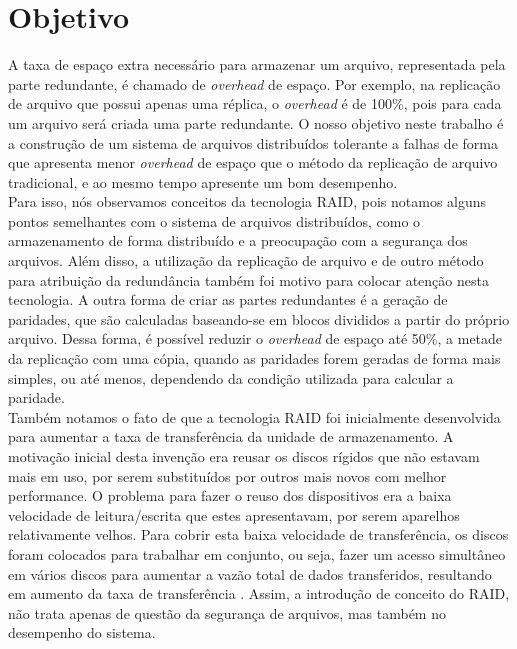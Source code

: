 
\section{Objetivo}

A taxa de espaço extra necessário para armazenar um arquivo, representada pela parte redundante, é chamado de \textit{overhead} de espaço.
Por exemplo, na replicação de arquivo que possui apenas uma réplica, o \textit{overhead} é de 100\%, pois para cada um arquivo será criada uma parte redundante.
O nosso objetivo neste trabalho é a construção de um sistema de arquivos distribuídos tolerante a falhas de forma que apresenta menor \textit{overhead} de espaço que o método da replicação de arquivo tradicional, e ao mesmo tempo apresente um bom desempenho.
\\

Para isso, nós observamos conceitos da tecnologia RAID, pois notamos alguns pontos semelhantes com o sistema de arquivos distribuídos, como o armazenamento de forma distribuído e a preocupação com a segurança dos arquivos.
Além disso, a utilização da replicação de arquivo e de outro método para atribuição da redundância também foi motivo para colocar atenção nesta tecnologia.
A outra forma de criar as partes redundantes é a geração de paridades, que são calculadas baseando-se em blocos divididos a partir do próprio arquivo.
Dessa forma, é possível reduzir o \textit{overhead} de espaço até 50\%, a metade da replicação com uma cópia, quando as paridades forem geradas de forma mais simples, ou até menos, dependendo da condição utilizada para calcular a paridade.
\\

Também notamos o fato de que a tecnologia RAID foi inicialmente desenvolvida para aumentar a taxa de transferência da unidade de armazenamento.
A motivação inicial desta invenção era reusar os discos rígidos que não estavam mais em uso, por serem substituídos por outros mais novos com melhor performance.
O problema para fazer o reuso dos dispositivos era a baixa velocidade de leitura/escrita que estes apresentavam, por serem aparelhos relativamente velhos. 
Para cobrir esta baixa velocidade de transferência, os discos foram colocados para trabalhar em conjunto, ou seja, fazer um acesso simultâneo em vários discos para aumentar a vazão total de dados transferidos, resultando em aumento da taxa de transferência .
Assim, a introdução de conceito do RAID, não trata apenas de questão da segurança de arquivos, mas também no desempenho do sistema.  
\\

